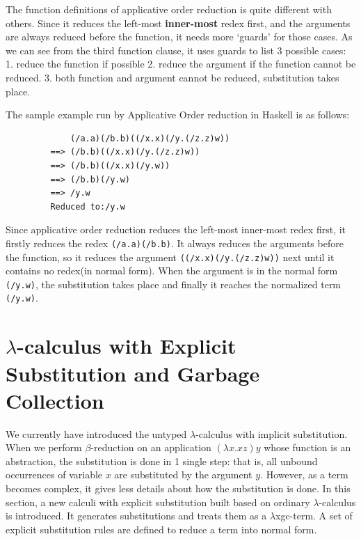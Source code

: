 The function definitions of applicative order reduction is quite different with others. Since it reduces the left-most \textbf{inner-most} redex first, and the arguments are always reduced before the function, it needs more `guards' for those cases. As we can see from the third function clause, it uses guards to list 3 possible cases: 1. reduce the function if possible 2. reduce the argument if the function cannot be reduced. 3. both function and argument cannot be reduced, substitution takes place. 


\begin{exmp}
\normalfont The sample example run by Applicative Order reduction in Haskell is as follows:
\end{exmp}

\begin{verbatim}
             (/a.a)(/b.b)((/x.x)(/y.(/z.z)w))
         ==> (/b.b)((/x.x)(/y.(/z.z)w))
         ==> (/b.b)((/x.x)(/y.w))
         ==> (/b.b)(/y.w)
         ==> /y.w
         Reduced to:/y.w
\end{verbatim}

Since applicative order reduction reduces the left-most inner-most redex first, it firstly reduces the redex \verb|(/a.a)(/b.b)|. It always reduces the arguments before the function, so it reduces the argument \verb|((/x.x)(/y.(/z.z)w))| next until it contains no redex(in normal form). When the argument is in the normal form \verb|(/y.w)|, the substitution takes place and finally it reaches the normalized term \verb|(/y.w)|.


\section{$\lambda$-calculus with Explicit Substitution and Garbage Collection}

We currently have introduced the untyped $\lambda$-calculus with implicit substitution. When we perform $\beta$-reduction on an application $(\lambda x.xz)y$ whose function is an abstraction, the substitution is done in 1 single step: that is, all unbound occurrences of variable $x$ are substituted by the argument $y$. However, as a term becomes complex, it gives less details about how the substitution is done. In this section, a new calculi with explicit substitution built based on ordinary $\lambda$-calculus is introduced. It generates substitutions and treats them as a $\lambda$xgc-term. A set of explicit substitution rules are defined to reduce a term into normal form.  

